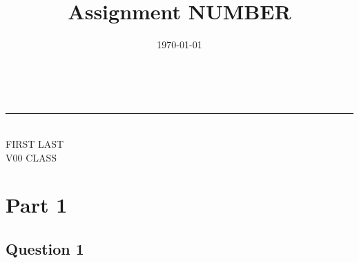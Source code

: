 \documentclass[12pt]{article}
\makeatletter
\newcommand{\linia}{\rule{\linewidth}{0.5pt}}
\renewcommand{\maketitle}{
\begin{center}
\vspace{2ex}
{\huge \textsc{\@title}}
\vspace{1ex}
\\
\linia\\
FIRST LAST  \hfill \@date \\
V00 \hfill \textsc{CLASS}
\vspace{4ex}
\end{center}
}
\makeatother
\begin{document}
\title{Assignment NUMBER}

\date{\today}
\maketitle
	

\section{Part 1}
	\subsection{Question 1}
\end{document}
